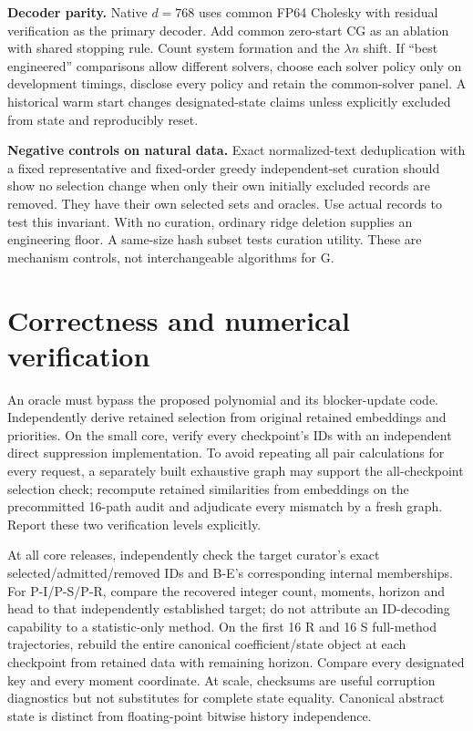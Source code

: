 \documentclass[11pt,a4paper]{article}
\begin{document}
\textbf{Decoder parity.} Native $d=768$ uses common FP64 Cholesky with residual verification as the primary decoder. Add common zero-start CG as an ablation with shared stopping rule. Count system formation and the $\lambda n$ shift. If ``best engineered'' comparisons allow different solvers, choose each solver policy only on development timings, disclose every policy and retain the common-solver panel. A historical warm start changes designated-state claims unless explicitly excluded from state and reproducibly reset.

\textbf{Negative controls on natural data.} Exact normalized-text deduplication with a fixed representative and fixed-order greedy independent-set curation should show no selection change when only their own initially excluded records are removed. They have their own selected sets and oracles. Use actual records to test this invariant. With no curation, ordinary ridge deletion supplies an engineering floor. A same-size hash subset tests curation utility. These are mechanism controls, not interchangeable algorithms for G.

\section{Correctness and numerical verification}
An oracle must bypass the proposed polynomial and its blocker-update code. Independently derive retained selection from original retained embeddings and priorities. On the small core, verify every checkpoint's IDs with an independent direct suppression implementation. To avoid repeating all pair calculations for every request, a separately built exhaustive graph may support the all-checkpoint selection check; recompute retained similarities from embeddings on the precommitted 16-path audit and adjudicate every mismatch by a fresh graph. Report these two verification levels explicitly.

At all core releases, independently check the target curator's exact selected/admitted/removed IDs and B-E's corresponding internal memberships. For P-I/P-S/P-R, compare the recovered integer count, moments, horizon and head to that independently established target; do not attribute an ID-decoding capability to a statistic-only method. On the first 16 R and 16 S full-method trajectories, rebuild the entire canonical coefficient/state object at each checkpoint from retained data with remaining horizon. Compare every designated key and every moment coordinate. At scale, checksums are useful corruption diagnostics but not substitutes for complete state equality. Canonical abstract state is distinct from floating-point bitwise history independence.
\end{document}
